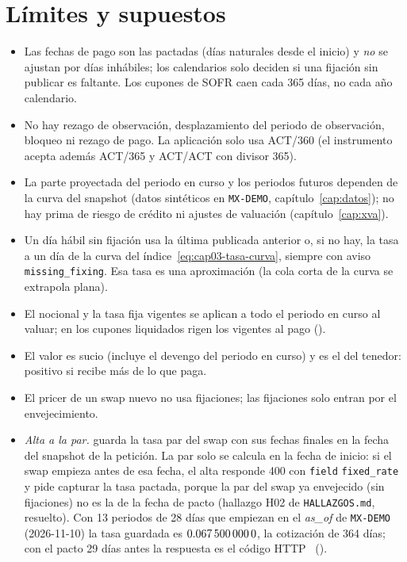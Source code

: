 \section{Límites y supuestos}\label{sec:cap03-limites}

\begin{limites}
  \begin{itemize}
    \item Las fechas de pago son las pactadas (días naturales desde el inicio) y \emph{no} se ajustan por días
          inhábiles; los calendarios solo deciden si una fijación sin publicar es faltante. Los cupones de
          SOFR caen cada 365 días, no cada año calendario.
    \item No hay rezago de observación, desplazamiento del periodo de observación, bloqueo ni rezago de pago.
          La aplicación solo usa ACT/360 (el instrumento acepta además ACT/365 y ACT/ACT con divisor 365).
    \item La parte proyectada del periodo en curso y los periodos futuros dependen de la curva del snapshot
          (datos sintéticos en \texttt{MX-DEMO}, capítulo~\ref{cap:datos}); no hay prima de riesgo de crédito ni
          ajustes de valuación (capítulo~\ref{cap:xva}).
    \item Un día hábil sin fijación usa la última publicada anterior o, si no hay, la tasa a un día de la curva
          del índice~\eqref{eq:cap03-tasa-curva}, siempre con aviso \texttt{missing\_fixing}. Esa tasa es una
          aproximación (la cola corta de la curva se extrapola plana).
    \item El nocional y la tasa fija vigentes se aplican a todo el periodo en curso al valuar; en los cupones
          liquidados rigen los vigentes al pago ().
    \item El valor es sucio (incluye el devengo del periodo en curso) y es el del tenedor: positivo si
          recibe más de lo que paga.
    \item El pricer de un swap nuevo no usa fijaciones; las fijaciones solo entran por el envejecimiento.
    \item \emph{Alta a la par.}  guarda la tasa par del swap con sus fechas
          finales en la fecha del snapshot de la petición. La par solo se calcula en la fecha de inicio: si el
          swap empieza antes de esa fecha, el alta responde 400 con \texttt{field} \texttt{fixed\_rate} y pide
          capturar la tasa pactada, porque la par del swap ya envejecido (sin fijaciones) no es la de la fecha de
          pacto (hallazgo H02 de \texttt{HALLAZGOS.md}, resuelto). Con 13 periodos de 28 días que empiezan en
          el \emph{as\_of} de \texttt{MX-DEMO} (2026-11-10) la tasa guardada es
          $\verif{cap03-alta-par-tasa}{0.0675000000}$, la cotización de 364 días; con el pacto 29 días antes la
          respuesta es el código HTTP~
          ().
  \end{itemize}
\end{limites}

